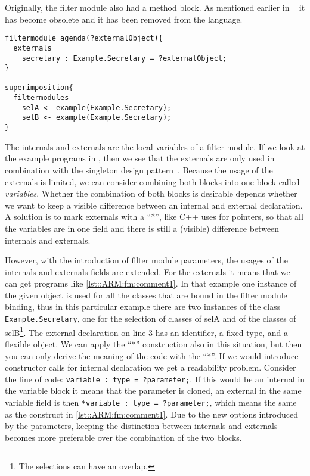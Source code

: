 Originally, the filter module also had a method block. As mentioned earlier in ~\cite{Doornenbal2006} it has become obsolete
and it has been removed from the language.

\begin{lstlisting}[caption = {A parameter as external object}, label = lst::ARM:fm:comment1,
style = listing, language =Composestar, float = tpb]
filtermodule agenda(?externalObject){
  externals
    secretary : Example.Secretary = ?externalObject;
}

superimposition{
  filtermodules
    selA <- example(Example.Secretary);
    selB <- example(Example.Secretary);
}
\end{lstlisting}
The internals and externals are the local variables of a filter module. If we look at the example programs in \Compose*, then we see
that the externals are only used in combination with the singleton design pattern~\cite{Gamma95}. Because
the usage of the externals is limited, we can consider combining both blocks into one block called \emph{variables}.
Whether the combination of both blocks is desirable depends whether we want to keep a visible difference
between an internal and external declaration. A solution is to mark externals with a ``*'', like C++ uses for pointers, so that all the
variables are in one field and there is still a (visible) difference between internals and externals.

However, with the introduction of filter module parameters, the usages of the internals and externals fields are extended.
For the externals it means that we can get programs like \autoref{lst::ARM:fm:comment1}. In that example
one instance of the given object is used for all the classes that are bound in the filter module binding, thus
in this particular example there are two instances of the class \lstinline!Example.Secretary!, one for the selection
of classes of selA and of the classes of selB\footnote{The selections can have an overlap.}.
The external declaration on line 3 has an identifier, a fixed type, and a flexible object.
We can apply the ``*'' construction also in this situation, but then you can only derive the meaning of the code with the ``*''. If we would introduce constructor calls for internal declaration we get a readability problem.
Consider the line of code: \lstinline|variable : type = ?parameter;|. If this would be an internal in the
variable block it means that the parameter is cloned, an external in the same variable field is then
\lstinline|*variable : type = ?parameter;|, which means the same as the construct in \autoref{lst::ARM:fm:comment1}.
Due to the new options introduced by the parameters, keeping the distinction between internals and externals becomes
more preferable over the combination of the two blocks.

